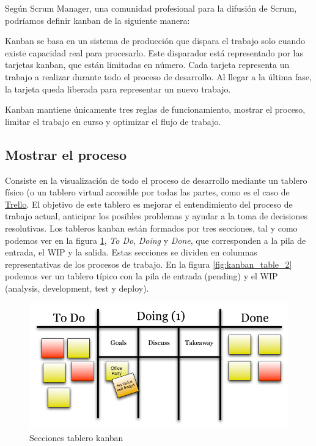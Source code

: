 Según Scrum Manager, una comunidad profesional para la difusión de Scrum, podríamos definir kanban \cite{Pal15} de la siguiente manera:


Kanban se basa en un sistema de producción que dispara el trabajo solo cuando existe capacidad real para procesarlo\cite{Bahi11}. Este disparador está representado por las tarjetas kanban, que están limitadas en número. Cada tarjeta representa un trabajo a realizar durante todo el proceso de desarrollo. Al llegar a la última fase, la tarjeta queda liberada para representar un nuevo trabajo.

Kanban mantiene únicamente tres reglas de funcionamiento, mostrar el proceso, limitar el trabajo en curso y optimizar el flujo de trabajo.

	\subsection{Mostrar el proceso}
	Consiste en la visualización de todo el proceso de desarrollo mediante un tablero físico (o un tablero virtual accesible por todas las partes, como es el caso de \href{https://trello.com/}{Trello}. El objetivo de este tablero es mejorar el entendimiento del proceso de trabajo actual, anticipar los posibles problemas y ayudar a la toma de decisiones resolutivas.
	Los tableros kanban están formados por tres secciones, tal y como podemos ver en la figura \ref{fig:kanban_table_1}, \textit{To Do}, \textit{Doing} y \textit{Done}, que corresponden a la pila de entrada, el \ac{WIP} y la salida. Estas secciones se dividen en columnas representativas de los procesos de trabajo. En la figura \ref{fig:kanban_table_2} podemos ver un tablero típico con la pila de entrada (pending) y el \ac{WIP} (analysis, development, test y deploy).
	
	\begin{figure}[H]
	\centering
	\includegraphics[scale=1, fbox={\fboxrule} 4mm]{images/04-metodo/02-kanban_table_1.png}
	\caption{Secciones tablero kanban}
	\label{fig:kanban_table_1}
	\end{figure}
	
